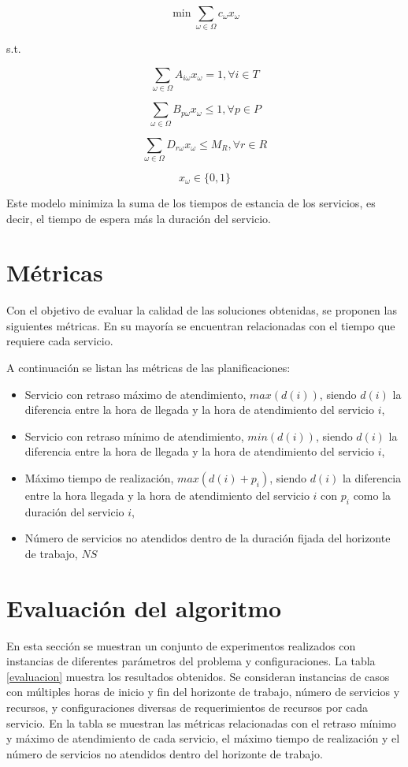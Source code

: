 $$ \min \sum_{\omega \in \Omega} c_{\omega}x_{\omega}$$

\hspace{125 pt} s.t.

$$\sum_{\omega \in \Omega} A_{i\omega} x_{\omega} = 1, \forall i \in T$$

$$\sum_{\omega \in \Omega} B_{p\omega} x_{\omega} \leq 1, \forall p \in P$$

$$\sum_{\omega \in \Omega} D_{r\omega} x_{\omega} \leq M_R, \forall r \in R$$

$$x_{\omega} \in \{0, 1\}$$

Este modelo minimiza la suma de los tiempos de estancia de los servicios, es decir, el tiempo de espera más la duración del servicio. 

\section{Métricas}

Con el objetivo de evaluar la calidad de las soluciones obtenidas, se proponen las siguientes métricas. En su mayoría se encuentran relacionadas con el tiempo que requiere cada servicio.

A continuación se listan las métricas de las planificaciones:
\begin{itemize}
   \item Servicio con retraso m\'aximo de atendimiento, $max(d(i))$, siendo $d(i)$ la diferencia entre la hora de llegada y la hora de atendimiento del servicio $i$,
   \item Servicio con retraso mínimo de atendimiento, $min(d(i))$, siendo $d(i)$ la diferencia entre la hora de llegada y la hora de atendimiento del servicio $i$,
   \item M\'aximo tiempo de realización, $max(d(i) + p_i)$, siendo $d(i)$ la diferencia entre la hora llegada y la hora de atendimiento del servicio $i$ con $p_i$ como la duración del servicio $i$,
   \item Número de servicios no atendidos dentro de la duración fijada del horizonte de trabajo, $NS$
\end{itemize}

\section{Evaluación del algoritmo}

En esta sección se muestran un conjunto de experimentos realizados con instancias de diferentes parámetros del problema y configuraciones. La tabla \ref{evaluacion} muestra los resultados obtenidos. Se consideran instancias de casos con múltiples horas de inicio y fin del horizonte de trabajo, número de servicios y recursos, y configuraciones diversas de requerimientos de recursos por cada servicio. En la tabla se muestran las métricas relacionadas con el retraso mínimo y máximo de atendimiento de cada servicio, el máximo tiempo de realización y el número de servicios no atendidos dentro del horizonte de trabajo. 

